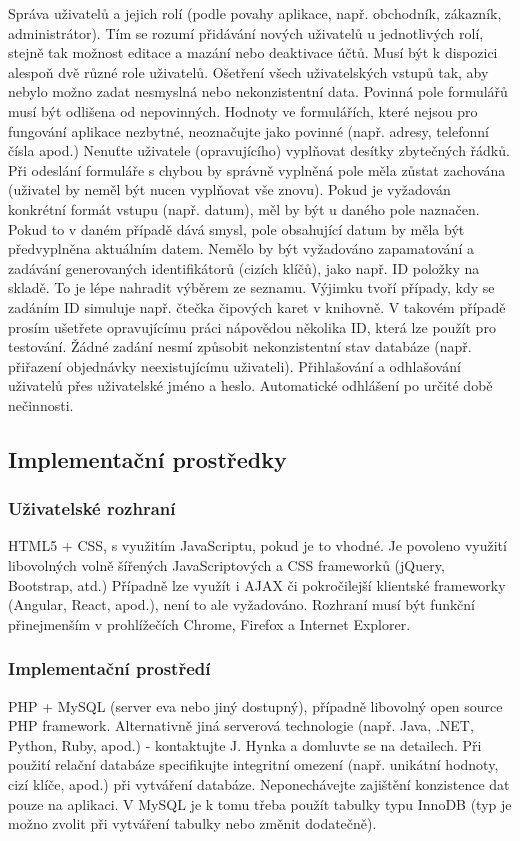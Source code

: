 \documentclass[11pt, a4paper, titlepage]{article}
\begin{document}
Správa uživatelů a jejich rolí (podle povahy aplikace, např. obchodník, zákazník, administrátor). Tím se rozumí přidávání nových uživatelů u jednotlivých rolí, stejně tak možnost editace a mazání nebo deaktivace účtů. Musí být k dispozici alespoň dvě různé role uživatelů.
Ošetření všech uživatelských vstupů tak, aby nebylo možno zadat nesmyslná nebo nekonzistentní data.
Povinná pole formulářů musí být odlišena od nepovinných.
Hodnoty ve formulářích, které nejsou pro fungování aplikace nezbytné, neoznačujte jako povinné (např. adresy, telefonní čísla apod.) Nenuťte uživatele (opravujícího) vyplňovat desítky zbytečných řádků.
Při odeslání formuláře s chybou by správně vyplněná pole měla zůstat zachována (uživatel by neměl být nucen vyplňovat vše znovu).
Pokud je vyžadován konkrétní formát vstupu (např. datum), měl by být u daného pole naznačen.
Pokud to v daném případě dává smysl, pole obsahující datum by měla být předvyplněna aktuálním datem.
Nemělo by být vyžadováno zapamatování a zadávání generovaných identifikátorů (cizích klíčů), jako např. ID položky na skladě. To je lépe nahradit výběrem ze seznamu. Výjimku tvoří případy, kdy se zadáním ID simuluje např. čtečka čipových karet v knihovně. V takovém případě prosím ušetřete opravujícímu práci nápovědou několika ID, která lze použít pro testování.
Žádné zadání nesmí způsobit nekonzistentní stav databáze (např. přiřazení objednávky neexistujícímu uživateli).
Přihlašování a odhlašování uživatelů přes uživatelské jméno a heslo. Automatické odhlášení po určité době nečinnosti.


\subsection*{Implementační prostředky}

\subsubsection*{Uživatelské rozhraní}
HTML5 + CSS, s využitím JavaScriptu, pokud je to vhodné. Je povoleno využití libovolných volně šířených JavaScriptových a CSS frameworků (jQuery, Bootstrap, atd.)
Případně lze využít i AJAX či pokročilejší klientské frameworky (Angular, React, apod.), není to ale vyžadováno.
Rozhraní musí být funkční přinejmenším v prohlížečích Chrome, Firefox a Internet Explorer.

\subsubsection*{Implementační prostředí}
PHP + MySQL (server eva nebo jiný dostupný), případně libovolný open source PHP framework.
Alternativně jiná serverová technologie (např. Java, .NET, Python, Ruby, apod.) - kontaktujte J. Hynka a domluvte se na detailech.
Při použití relační databáze specifikujte integritní omezení (např. unikátní hodnoty, cizí klíče, apod.) při vytváření databáze. Neponechávejte zajištění konzistence dat pouze na aplikaci. V MySQL je k tomu třeba použít tabulky typu InnoDB (typ je možno zvolit při vytváření tabulky nebo změnit dodatečně).
\end{document}
